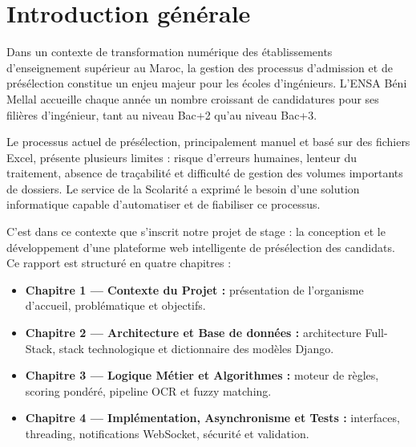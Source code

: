 \chapter*{Introduction générale}

Dans un contexte de transformation numérique des établissements d'enseignement supérieur au Maroc, la gestion des processus d'admission et de présélection constitue un enjeu majeur pour les écoles d'ingénieurs. L'ENSA Béni Mellal accueille chaque année un nombre croissant de candidatures pour ses filières d'ingénieur, tant au niveau Bac+2 qu'au niveau Bac+3.

Le processus actuel de présélection, principalement manuel et basé sur des fichiers Excel, présente plusieurs limites : risque d'erreurs humaines, lenteur du traitement, absence de traçabilité et difficulté de gestion des volumes importants de dossiers. Le service de la Scolarité a exprimé le besoin d'une solution informatique capable d'automatiser et de fiabiliser ce processus.

C'est dans ce contexte que s'inscrit notre projet de stage : la conception et le développement d'une plateforme web intelligente de présélection des candidats. Ce rapport est structuré en quatre chapitres :

\begin{itemize}[leftmargin=2cm]
  \item \textbf{Chapitre 1 --- Contexte du Projet :} présentation de l'organisme d'accueil, problématique et objectifs.
  \item \textbf{Chapitre 2 --- Architecture et Base de données :} architecture Full-Stack, stack technologique et dictionnaire des modèles Django.
  \item \textbf{Chapitre 3 --- Logique Métier et Algorithmes :} moteur de règles, scoring pondéré, pipeline OCR et fuzzy matching.
  \item \textbf{Chapitre 4 --- Implémentation, Asynchronisme et Tests :} interfaces, threading, notifications WebSocket, sécurité et validation.
\end{itemize}
